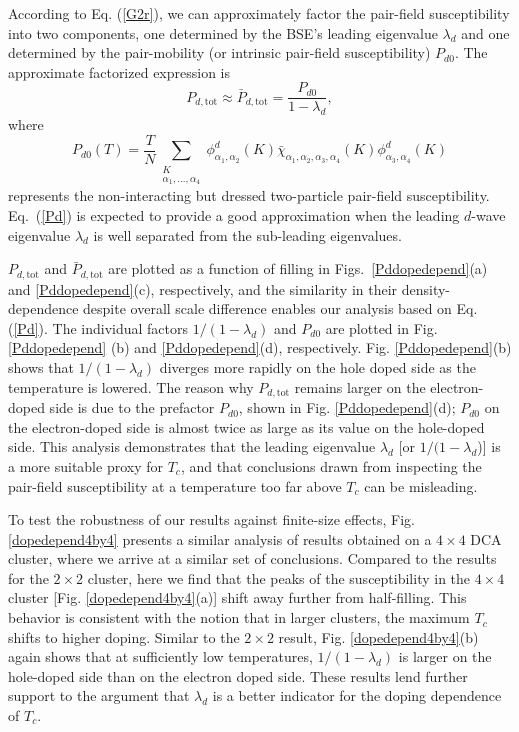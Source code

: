 \documentclass[reprint,nofootinbib,nobibnotes,amsmath,amssymb,aps,prb,floatfix]{revtex4-2}
\newcommand{\beq}{\begin{equation}}
\newcommand{\eeq}{\end{equation}}
\newcommand{\disp}[1]{Eq. (\ref{#1})}
\newcommand{\figdisp}[1]{Fig. \ref{#1}}
\begin{document}
According to \disp{G2r}, we can approximately factor the pair-field susceptibility into two components, one determined by the BSE's leading eigenvalue $\lambda_d$ and one determined by the pair-mobility (or intrinsic pair-field susceptibility) $P_{d0}$. The approximate factorized expression is
\beq
P_{d,\text{tot}}\approx \bar{P}_{d,\text{tot}}=\frac{P_{d0}}{1-\lambda_d}\label{Pd},
\eeq
where 
\beq\label{eq:Pd0}
P_{d0}(T) = \frac{T}{N}\sum_{\substack{K\\ \alpha_1, \dots, \alpha_4}} \phi^d_{\alpha_1,\alpha_2}(K) \bar{\chi}^{\phantom d}_{\alpha_1,\alpha_2,\alpha_3,\alpha_4}(K) \phi^d_{\alpha_3,\alpha_4}(K)
\eeq
represents the non-interacting but dressed two-particle pair-field susceptibility. Eq.~(\ref{Pd}) is expected to provide a good approximation when the leading $d$-wave eigenvalue $\lambda_d$ is well separated from the sub-leading eigenvalues. 

$P_{d,\text{tot}}$ and $\bar{P}_{d,\text{tot}}$ are plotted as a function 
of filling in Figs.~\ref{Pddopedepend}(a) and \ref{Pddopedepend}(c), respectively, and the similarity in their density-dependence despite overall scale difference enables our analysis based on \disp{Pd}. 
The individual factors $1/(1-\lambda_d)$ and $P_{d0}$ are plotted in \figdisp{Pddopedepend} (b) and \ref{Pddopedepend}(d), respectively. \figdisp{Pddopedepend}(b) shows that $1/(1-\lambda_d)$ diverges more rapidly on the hole doped side as the temperature is lowered. 
The reason why $P_{d,\text{tot}}$ remains larger on the electron-doped side is due to 
the prefactor $P_{d0}$, shown in \figdisp{Pddopedepend}(d); $P_{d0}$ on the electron-doped side is almost twice as large as its value on the hole-doped side. 
This analysis demonstrates that the leading eigenvalue $\lambda_d$ [or $1/(1-\lambda_d$)] is a more suitable proxy for $T_c$, and that conclusions drawn from inspecting the pair-field susceptibility at a temperature too far above $T_c$ can be misleading. 

To test the robustness of our results against finite-size effects, \figdisp{dopedepend4by4} presents a similar analysis of results obtained on a $4\times4$ DCA cluster, where we arrive at a similar set of conclusions. Compared to the results for the $2\times 2$ cluster, here we find that the peaks of the susceptibility in the $4\times4$ cluster [\figdisp{dopedepend4by4}(a)] shift away further from half-filling. This behavior is consistent with the notion that in larger clusters, the maximum $T_c$ shifts to higher doping. Similar to the $2\times 2$ result, \figdisp{dopedepend4by4}(b) again shows that at sufficiently low temperatures, $1/(1-\lambda_d)$ is larger on the hole-doped side than on the electron doped side. These results lend further support to the argument that $\lambda_d$ is a better indicator for the doping dependence of $T_c$.
\end{document}
